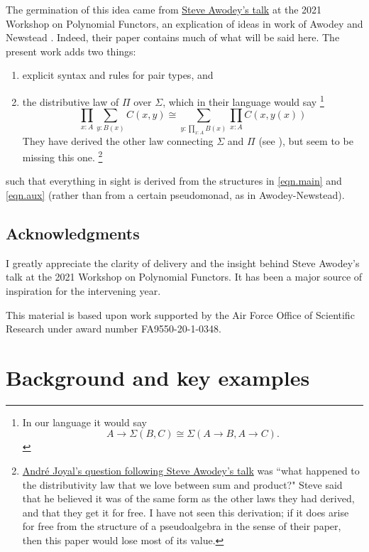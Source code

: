 \documentclass[11pt, one side, article]{memoir}
\theoremstyle{definition}
\theoremstyle{plain}
\newcommand{\0}{\textsf{0}}
\newcommand{\1}{\tn{\textsf{1}}}
\begin{document}
The germination of this idea came from \href{https://www.youtube.com/watch?v=RDuNIP4icKI\&t=10765s}{Steve Awodey's talk} at the 2021 Workshop on Polynomial Functors, an explication of ideas in work of Awodey and Newstead \cite{awodey2018polynomial}. Indeed, their paper contains much of what will be said here. The present work adds two things:
\begin{enumerate}
	\item explicit syntax and rules for pair types, and
	\item the distributive law of $\Pi$ over $\Sigma$, which in their language would say%
	\footnote{In our language it would say 
	\[
	A\to\Sigma(B,C)\cong \Sigma(A\to B,A\to C).
	\]
	}
	\[
	\prod_{x:A}\sum_{y:B(x)}C(x,y)\cong\sum_{y:\prod_{x:A}B(x)}\prod_{x:A}C(x,y(x))
	\]
	They have derived the other law connecting $\Sigma$ and $\Pi$ (see \cite[Remark 4.2]{awodey2018polynomial}), but seem to be missing this one.%
	\footnote{\href{https://youtu.be/RDuNIP4icKI?t=13898}{Andr\'{e} Joyal's question following Steve Awodey's talk} was ``what happened to the distributivity law that we love between sum and product?" Steve said that he believed it was of the same form as the other laws they had derived, and that they get it for free. I have not seen this derivation; if it does arise for free from the structure of a pseudoalgebra in the sense of their paper, then this paper would lose most of its value.
	}
\end{enumerate}
such that everything in sight is derived from the structures in \eqref{eqn.main} and \eqref{eqn.aux} (rather than from a certain pseudomonad, as in Awodey-Newstead).

\section{Acknowledgments}

I greatly appreciate the clarity of delivery and the insight behind Steve Awodey's talk at the 2021 Workshop on Polynomial Functors. It has been a major source of inspiration for the intervening year.

This material is based upon work supported by the Air Force Office of Scientific Research under award number FA9550-20-1-0348.

\chapter{Background and key examples}
\end{document}
